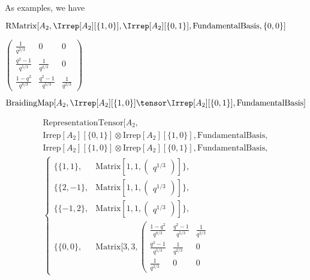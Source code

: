 As examples, we have



\begin{mma}
\begin{inm}$\text{RMatrix}[A_2, \Irrep[A_2][\{1,0\}], \Irrep[A_2][\{0,1\}], \text{FundamentalBasis}, \{0,0\}]$
\end{inm}
\begin{outm}$\left(\begin{array}{lll} \frac{1}{q^{2/3}} & 0 & 0 \\ \frac{q^2-1}{q^{5/3}} & \frac{1}{q^{2/3}} & 0 \\ \frac{1-q^2}{q^{8/3}} & \frac{q^2-1}{q^{5/3}} & \frac{1}{q^{2/3}}\end{array}\right)$\end{outm}
\begin{inm}$\text{BraidingMap}[A_2, \Irrep[A_2][\{1,0\}] \tensor \Irrep[A_2][\{0,1\}], \text{FundamentalBasis}]$
\end{inm}
\begin{outm}
\begin{equation*}
\begin{split}
\text{RepresentationTensor}[A_2,\\\text{Irrep}\left[A_2\right][\{0,1\}]\otimes
   \text{Irrep}\left[A_2\right][\{1,0\}],\text{FundamentalBasis}, \\
   \text{Irrep}\left[A_2\right][\{1,0\}]\otimes
   \text{Irrep}\left[A_2\right][\{0,1\}],\text{FundamentalBasis},\\
\left\{
\begin{array}{ll}
\{
 \{1,1\}, & \text{Matrix}\left[1,1,\left(
\begin{array}{l}
 q^{1/3}
\end{array}
\right)\right] \},\\\{
 \{2,-1\}, & \text{Matrix}\left[1,1,\left(
\begin{array}{l}
 q^{1/3}
\end{array}
\right)\right] \},\\\{
 \{-1,2\}, & \text{Matrix}\left[1,1,\left(
\begin{array}{l}
 q^{1/3}
\end{array}
\right)\right] \},\\\{
 \{0,0\}, & \text{Matrix}[3,3,\left(
\begin{array}{lll}
 \frac{1-q^2}{q^{8/3}} & \frac{q^2-1}{q^{5/3}} & \frac{1}{q^{2/3}} \\
 \frac{q^2-1}{q^{5/3}} & \frac{1}{q^{2/3}} & 0 \\
 \frac{1}{q^{2/3}} & 0 & 0

\end{array}
\end{array}
\end{split}
\end{equation*}
\end{outm}
\end{mma}
